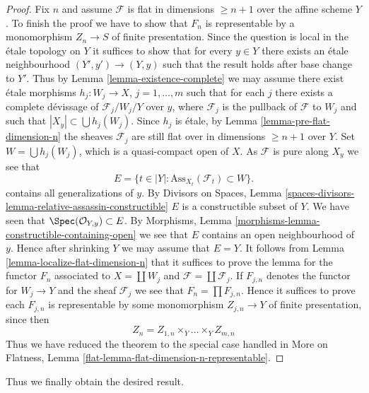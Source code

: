 \begin{proof}
\medskip\noindent
Fix $n$ and assume $\mathcal{F}$ is flat in dimensions $\geq n + 1$
over the affine scheme $Y$.
To finish the proof we have to show that $F_n$ is representable
by a monomorphism $Z_n \to S$ of finite presentation.
Since the question is local in the \'etale topology on $Y$ it suffices to
show that for every $y \in Y$ there exists an \'etale neighbourhood
$(Y', y') \to (Y, y)$ such that the result holds after base change to $Y'$.
Thus by
Lemma \ref{lemma-existence-complete}
we may assume there exist \'etale morphisms $h_j : W_j \to X$,
$j = 1, \ldots, m$ such that for each $j$ there exists a complete
d\'evissage of $\mathcal{F}_j/W_j/Y$ over $y$,
where $\mathcal{F}_j$ is the pullback of $\mathcal{F}$ to $W_j$
and such that $|X_y| \subset \bigcup h_j(W_j)$. Since
$h_j$ is \'etale, by
Lemma \ref{lemma-pre-flat-dimension-n}
the sheaves $\mathcal{F}_j$ are still flat over in
dimensions $\geq n + 1$ over $Y$.
Set $W = \bigcup h_j(W_j)$, which is a quasi-compact open of $X$.
As $\mathcal{F}$ is pure along $X_y$ we see that
$$
E = \{t \in |Y| : \text{Ass}_{X_t}(\mathcal{F}_t) \subset W \}.
$$
contains all generalizations of $y$. By
Divisors on Spaces,
Lemma \ref{spaces-divisors-lemma-relative-assassin-constructible}
$E$ is a constructible subset of $Y$. We have seen that
$\Spec(\mathcal{O}_{Y, y}) \subset E$. By
Morphisms, Lemma \ref{morphisms-lemma-constructible-containing-open}
we see that $E$ contains an open neighbourhood of $y$.
Hence after shrinking $Y$ we may assume that $E = Y$.
It follows from
Lemma \ref{lemma-localize-flat-dimension-n}
that it suffices to prove the lemma for the functor $F_n$ associated to
$X = \coprod W_j$ and $\mathcal{F} = \coprod \mathcal{F}_j$.
If $F_{j, n}$ denotes the functor for $W_j \to Y$ and the sheaf
$\mathcal{F}_j$ we see that $F_n = \prod F_{j, n}$. Hence it suffices
to prove each $F_{j, n}$ is representable by some monomorphism
$Z_{j, n} \to Y$ of finite presentation, since then
$$
Z_n = Z_{1, n} \times_Y \ldots \times_Y Z_{m, n}
$$
Thus we have reduced the theorem to the special case handled in
More on Flatness, Lemma \ref{flat-lemma-flat-dimension-n-representable}.
\end{proof}

\noindent
Thus we finally obtain the desired result.

